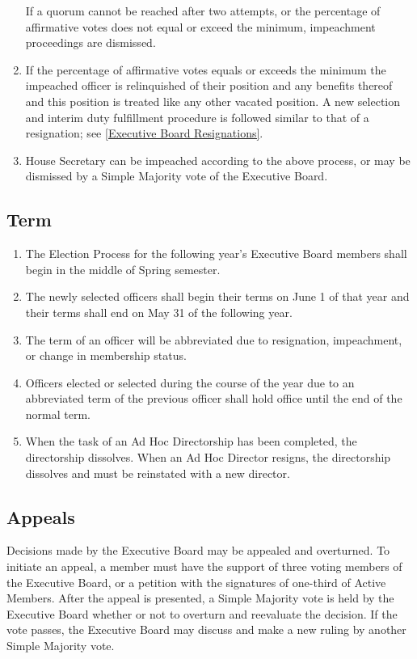 \documentclass{article}
\newcommand{\asection}[1]{\subsection{#1} \label{#1}}
\begin{document}
\begin{enumerate}
		If a quorum cannot be reached after two attempts, or the percentage of affirmative votes does not equal or exceed the minimum, impeachment proceedings are dismissed.
	\item If the percentage of affirmative votes equals or exceeds the minimum the impeached officer is relinquished of their position and any benefits thereof and this position is treated like any other vacated position.
		A new selection and interim duty fulfillment procedure is followed similar to that of a resignation; see \ref{Executive Board Resignations}.
	\item House Secretary can be impeached according to the above process, or may be dismissed by a Simple Majority vote of the Executive Board.
\end{enumerate}

\asection{Term}
\begin{enumerate}
\item The Election Process for the following year's Executive Board members shall begin in the middle of Spring semester.
\item The newly selected officers shall begin their terms on June 1 of that year and their terms shall end on May 31 of the following year.
\item The term of an officer will be abbreviated due to resignation, impeachment, or change in membership status.
\item Officers elected or selected during the course of the year due to an abbreviated term of the previous officer shall hold office until the end of the normal term.
\item When the task of an Ad Hoc Directorship has been completed, the directorship dissolves.
	When an Ad Hoc Director resigns, the directorship dissolves and must be reinstated with a new director.
\end{enumerate}

\asection{Appeals}
Decisions made by the Executive Board may be appealed and overturned.
To initiate an appeal, a member must have the support of three voting members of the Executive Board, or a petition with the signatures of one-third of Active Members.
After the appeal is presented, a Simple Majority vote is held by the Executive Board whether or not to overturn and reevaluate the decision.
If the vote passes, the Executive Board may discuss and make a new ruling by another Simple Majority vote.
\end{document}
